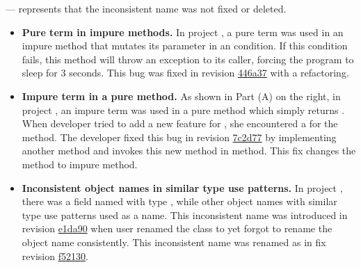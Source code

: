 \begin{figure*}[!htb]
\begin{minipage}{0.47\textwidth}
{\begin{tabular}{@{}l|p{3cm}p{3cm}}
\end{tabular} \newline
--- represents that the inconsistent name was not fixed or deleted. 
 }
  \begin{itemize} 
\item \textbf{Pure term in impure methods.} In project , a pure term  was used in an impure method  that mutates its parameter  in an  condition. If this condition fails, this  method will throw an exception to its caller, forcing the program to sleep for 3 seconds. This bug was fixed in revision \href{https://github.com/apache/accumulo/commit/446a37a#diff-002fc1274cd98bf226ee8398551261a6}{446a37} with a refactoring. 
\item \textbf{Impure term in a pure method.} As shown in Part (A) on the right, in project , an impure term  was used in a pure method  which simply returns .  When developer tried to add a new feature for , she encountered a  for the  method. The developer fixed this bug in revision \href{https://github.com/apache/hadoop/commit/7c2d77#diff-c0169961c9fbca7c0a7b3afb2049665a}{7c2d77}  by implementing another  method and invokes this new method in  method. This fix changes  the method  to impure method.
\item \textbf{Inconsistent object names in similar type use patterns.} In project , there was a field named  with type , while other object names with similar type use patterns used  as a name. This inconsistent name was introduced in revision \href{https://github.com/apache/hbase/commit/e1da900df#diff-b9d8ad451ab3fd5f5ff8593268230822}{e1da90} when user renamed the class  to  yet forgot to rename the object name consistently. This inconsistent name was renamed as  in fix revision \href{https://github.com/apache/hbase/commit/f52130953245d93489a9c700c3b00eedbe70fdb9/src/main/java/org/apache/hadoop/hbase/regionserver/HRegion.java}{f52130}. 

\end{itemize}
\end{minipage}
\end{figure*}

